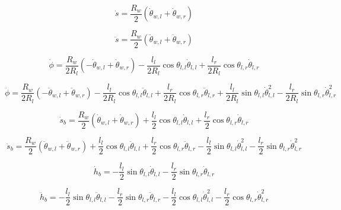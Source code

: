 \documentclass[
  oneside,
  degree=bachelor,
  fullwidthstop=false,
  fontset=fandol,
  times=false,
  minted=true,
  biblatex=true,
]{tongjithesis}
\begin{document}
\begin{equation}
\dot{s} = \frac{R_w}{2}(\dot{\theta}_{w,l} + \dot{\theta}_{w,r}) 
\label{eq:ds}
\end{equation}

\begin{equation}
\ddot{s} = \frac{R_w}{2}(\ddot{\theta}_{w,l} + \ddot{\theta}_{w,r}) 
\label{eq:dds}
\end{equation}

\begin{equation}
\dot{\phi} = \frac{R_w}{2R_l}(-\dot{\theta}_{w,l} + \dot{\theta}_{w,r}) - \frac{l_l}{2R_l}\cos\theta_{l,l}\dot{\theta}_{l,l} + \frac{l_r}{2R_l}\cos\theta_{l,r}\dot{\theta}_{l,r} 
\end{equation}

\begin{equation}
\ddot{\phi} = \frac{R_w}{2R_l}(-\ddot{\theta}_{w,l} + \ddot{\theta}_{w,r}) - \frac{l_l}{2R_l}\cos\theta_{l,l}\ddot{\theta}_{l,l} + \frac{l_r}{2R_l}\cos\theta_{l,r}\ddot{\theta}_{l,r} + \frac{l_l}{2R_l}\sin\theta_{l,l}\dot{\theta}_{l,l}^2 - \frac{l_r}{2R_l}\sin\theta_{l,r}\dot{\theta}_{l,r}^2 
\end{equation}

\begin{equation}
\dot{s}_b = \frac{R_w}{2}(\dot{\theta}_{w,l} + \dot{\theta}_{w,r}) + \frac{l_l}{2}\cos\theta_{l,l}\dot{\theta}_{l,l} + \frac{l_r}{2}\cos\theta_{l,r}\dot{\theta}_{l,r} 
\end{equation}

\begin{equation}
\ddot{s}_b = \frac{R_w}{2}(\ddot{\theta}_{w,l} + \ddot{\theta}_{w,r}) + \frac{l_l}{2}\cos\theta_{l,l}\ddot{\theta}_{l,l} + \frac{l_r}{2}\cos\theta_{l,r}\ddot{\theta}_{l,r} - \frac{l_l}{2}\sin\theta_{l,l}\dot{\theta}_{l,l}^2 - \frac{l_r}{2}\sin\theta_{l,r}\dot{\theta}_{l,r}^2 
\end{equation}

\begin{equation}
\dot{h}_b = -\frac{l_l}{2}\sin\theta_{l,l}\dot{\theta}_{l,l} - \frac{l_r}{2}\sin\theta_{l,r}\dot{\theta}_{l,r} 
\end{equation}

\begin{equation}
\ddot{h}_b = -\frac{l_l}{2}\sin\theta_{l,l}\ddot{\theta}_{l,l} - \frac{l_r}{2}\sin\theta_{l,r}\ddot{\theta}_{l,r} - \frac{l_l}{2}\cos\theta_{l,l}\dot{\theta}_{l,l}^2 - \frac{l_r}{2}\cos\theta_{l,r}\dot{\theta}_{l,r}^2 
\end{equation}
\end{document}
